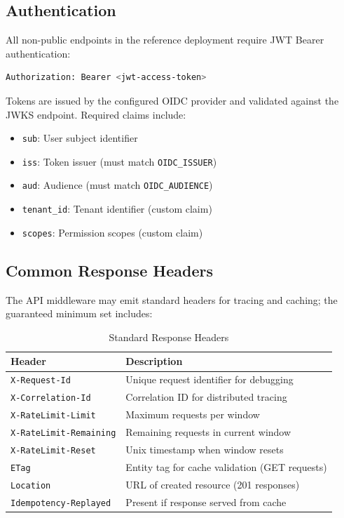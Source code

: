 \documentclass[a4paper,twoside]{sapthesis}
\begin{document}
\subsection{Authentication}

All non-public endpoints in the reference deployment require JWT Bearer authentication:

\begin{lstlisting}[language=bash]
Authorization: Bearer <jwt-access-token>
\end{lstlisting}

Tokens are issued by the configured OIDC provider and validated against the JWKS endpoint. Required claims include:
\begin{itemize}
    \item \texttt{sub}: User subject identifier
    \item \texttt{iss}: Token issuer (must match \texttt{OIDC\_ISSUER})
    \item \texttt{aud}: Audience (must match \texttt{OIDC\_AUDIENCE})
    \item \texttt{tenant\_id}: Tenant identifier (custom claim)
    \item \texttt{scopes}: Permission scopes (custom claim)
\end{itemize}

\subsection{Common Response Headers}

The API middleware may emit standard headers for tracing and caching; the guaranteed minimum set includes:

\begin{table}[ht]
\centering
\caption{Standard Response Headers}
\label{tab:response-headers}
\small
\begin{tabularx}{\textwidth}{lX}
    \hline
    \textbf{Header} & \textbf{Description} \\
    \hline
    \texttt{X-Request-Id} & Unique request identifier for debugging \\
    \texttt{X-Correlation-Id} & Correlation ID for distributed tracing \\
    \texttt{X-RateLimit-Limit} & Maximum requests per window \\
    \texttt{X-RateLimit-Remaining} & Remaining requests in current window \\
    \texttt{X-RateLimit-Reset} & Unix timestamp when window resets \\
    \texttt{ETag} & Entity tag for cache validation (GET requests) \\
    \texttt{Location} & URL of created resource (201 responses) \\
    \texttt{Idempotency-Replayed} & Present if response served from cache \\
    \hline
\end{tabularx}
\end{table}
\end{document}
